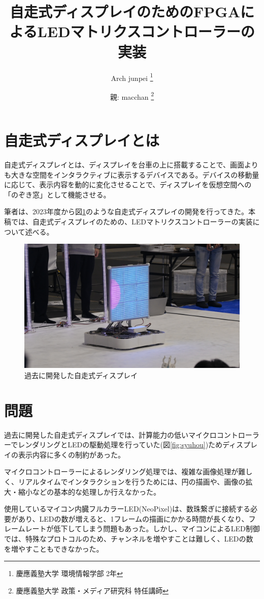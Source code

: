 \documentclass[a4paper,11pt, twocolumn]{ltjsarticle}
\title{ 自走式ディスプレイのためのFPGAによるLEDマトリクスコントローラーの実装 }
\author{ 
  Arch junpei \thanks{慶應義塾大学 環境情報学部 2年} \\
  \and
  親: macchan \thanks{慶應義塾大学 政策・メディア研究科 特任講師}
}
\date{}
\begin{document}
\maketitle

\section{自走式ディスプレイとは}
自走式ディスプレイとは、ディスプレイを台車の上に搭載することで、画面よりも大きな空間をインタラクティブに表示するデバイスである。デバイスの移動量に応じて、表示内容を動的に変化させることで、ディスプレイを仮想空間への「のぞき窓」\cite{fitzmaurice1993}として機能させる。

筆者は、2023年度から図\ref{fig:display}のような自走式ディスプレイの開発を行ってきた。本稿では、自走式ディスプレイのための、LEDマトリクスコントローラーの実装について述べる。

\begin{figure}
\centering
\includegraphics[width=0.8\columnwidth]{display.jpg}
\caption{過去に開発した自走式ディスプレイ}
\label{fig:display}
\end{figure}

\section{問題}
過去に開発した自走式ディスプレイでは、計算能力の低いマイクロコントローラーでレンダリングとLEDの駆動処理を行っていた(図\ref{fig:syuhou})ためディスプレイの表示内容に多くの制約があった。

マイクロコントローラーによるレンダリング処理では、複雑な画像処理が難しく、リアルタイムでインタラクションを行うためには、円の描画や、画像の拡大・縮小などの基本的な処理しか行えなかった。

使用しているマイコン内臓フルカラーLED(NeoPixel)は、数珠繋ぎに接続する必要があり、LEDの数が増えると、1フレームの描画にかかる時間が長くなり、フレームレートが低下してしまう問題もあった。しかし、マイコンによるLED制御では、特殊なプロトコル\cite{WS2812C2020V1}のため、チャンネルを増やすことは難しく、LEDの数を増やすこともできなかった。
\end{document}
